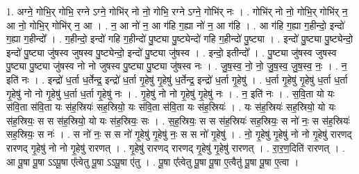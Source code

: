 \documentclass[17pt]{extarticle}
\begin{document}
1. अग्ने॒ गोभि॒र् गोभि॒ रग्ने ऽग्ने॒ गोभि॑र् नो नो॒ गोभि॒ रग्ने ऽग्ने॒ गोभि॑र् नः । . गोभि॑र् नो नो॒ गोभि॒र् गोभि॑र् न॒ आ नो॒ गोभि॒र् गोभि॑र् न॒ आ । . न॒ आ नो॑ न॒ आ ग॑हि ग॒ह्या नो॑ न॒ आ ग॑हि । . आ ग॑हि ग॒ह्या ग॒हीन्दो॒ इन्दो॑ ग॒ह्या ग॒हीन्दो᳚ । . ग॒हीन्दो॒ इन्दो॑ गहि ग॒हीन्दो॑ पु॒ष्ट्या पु॒ष्ट्येन्दो॑ गहि ग॒हीन्दो॑ पु॒ष्ट्या । . इन्दो॑ पु॒ष्ट्या पु॒ष्ट्येन्दो॒ इन्दो॑ पु॒ष्ट्या जु॑षस्व जुषस्व पु॒ष्ट्येन्दो॒ इन्दो॑ पु॒ष्ट्या जु॑षस्व । . इन्दो॒ इतीन्दो᳚ । . पु॒ष्ट्या जु॑षस्व जुषस्व पु॒ष्ट्या पु॒ष्ट्या जु॑षस्व नो नो जुषस्व पु॒ष्ट्या पु॒ष्ट्या जु॑षस्व नः । . जु॒ष॒स्व॒ नो॒ नो॒ जु॒ष॒स्व॒ जु॒ष॒स्व॒ नः॒ । . न॒ इति॑ नः । . इन्द्रो॑ ध॒र्ता ध॒र्तेन्द्र॒ इन्द्रो॑ ध॒र्ता गृ॒हेषु॑ गृ॒हेषु॑ ध॒र्तेन्द्र॒ इन्द्रो॑ ध॒र्ता गृ॒हेषु॑ । . ध॒र्ता गृ॒हेषु॑ गृ॒हेषु॑ ध॒र्ता ध॒र्ता गृ॒हेषु॑ नो नो गृ॒हेषु॑ ध॒र्ता ध॒र्ता गृ॒हेषु॑ नः । . गृ॒हेषु॑ नो नो गृ॒हेषु॑ गृ॒हेषु॑ नः । . न॒ इति॑ नः । . स॒वि॒ता यो यः स॑वि॒ता स॑वि॒ता यः स॑ह॒स्रियः॑ सह॒स्रियो॒ यः स॑वि॒ता स॑वि॒ता यः स॑ह॒स्रियः॑ । . यः स॑ह॒स्रियः॑ सह॒स्रियो॒ यो यः स॑ह॒स्रियः॒ स स स॑ह॒स्रियो॒ यो यः स॑ह॒स्रियः॒ सः । . स॒ह॒स्रियः॒ स स स॑ह॒स्रियः॑ सह॒स्रियः॒ स नो॑ नः॒ स स॑ह॒स्रियः॑ सह॒स्रियः॒ स नः॑ । . स नो॑ नः॒ स स नो॑ गृ॒हेषु॑ गृ॒हेषु॑ नः॒ स स नो॑ गृ॒हेषु॑ । . नो॒ गृ॒हेषु॑ गृ॒हेषु॑ नो नो गृ॒हेषु॑ रारणद् रारणद् गृ॒हेषु॑ नो नो गृ॒हेषु॑ रारणत् । . गृ॒हेषु॑ रारणद् रारणद् गृ॒हेषु॑ गृ॒हेषु॑ रारणत् । . रा॒र॒ण॒दिति॑ रारणत् । . आ पू॒षा पू॒षा ऽऽपू॒षा ए᳚त्वेतु पू॒षा ऽऽपू॒षा ए॑तु । . पू॒षा ए᳚त्वेतु पू॒षा पू॒षा ए॒त्वैतु॑ पू॒षा पू॒षा ए॒त्वा । \newline
\end{document}
